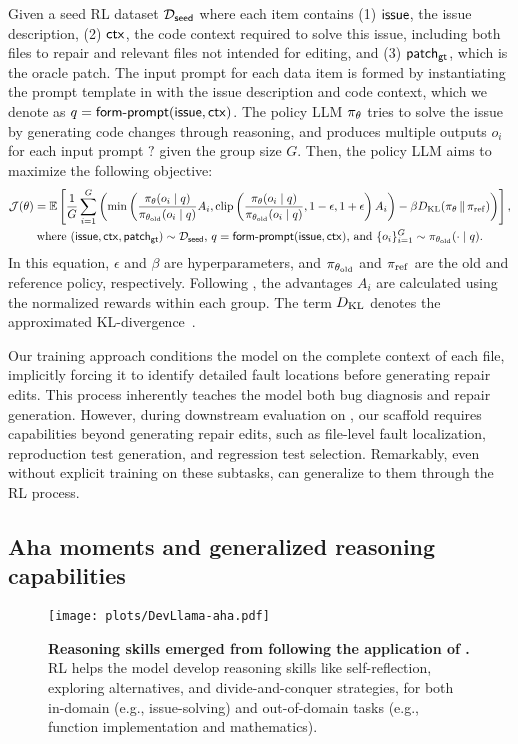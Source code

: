{Given a seed RL dataset $\mathcal D_\mathsf{seed}{}$ where each item contains
(1) $\mathsf{issue}{}$, the issue description,
(2) $\mathsf{ctx}$, the code context required to solve this issue, including both files to repair and relevant files not intended for editing,
and (3) $\mathsf{patch_{gt}}{}$, which is the oracle patch.
The input prompt for each data item is formed by instantiating the prompt template in  with the issue description and code context, which we denote as $q = \mathsf{form\mbox{-}prompt}(\mathsf{issue}, \mathsf{ctx})$.
The policy LLM $\mathit{\pi_{\theta}}$ tries to solve the issue by generating code changes through reasoning, and produces multiple outputs $o_i$ for each input prompt $\question$ given the group size $G$.
Then, the policy LLM aims to maximize the following \grpo objective:
\begin{equation}
\label{eq:grpo}
\begin{gathered}
\mathcal J(\theta) =
    {\mathbb E}\left[
         \frac1G\sum_{i=1}^G\left(
             \min\left(\frac {\mathit{\pi_{\theta}}(o_i \mid q)} {\mathit{\pi_{\theta_{\mathrm{old}}}}(o_i \mid q)} A_i, \mathrm{clip}\left(\frac {\mathit{\pi_{\theta}}(o_i \mid q)} {\mathit{\pi_{\theta_{\mathrm{old}}}}(o_i \mid q)}, 1-\epsilon, 1 + \epsilon\right)A_i\right)
             - \beta D_{\mathrm{KL}}(\mathit{\pi_{\theta}}\,\|\,\mathit{\pi_{\mathrm{ref}}})
         \right)
    \right],\\
    \text{where }(\mathsf{issue}, \mathsf{ctx}, \mathsf{patch_{gt}})\sim\mathcal D_\mathsf{seed}\text{, }
    q = \mathsf{form\mbox{-}prompt}(\mathsf{issue}, \mathsf{ctx})
    \text{, and }\{o_i\}_{i=1}^G \sim \mathit{\pi_{\theta_{\mathrm{old}}}}(\cdot \mid q).
\end{gathered}
\end{equation}
In this equation, $\epsilon$ and $\beta$ are hyperparameters, and $\mathit{\pi_{\theta_{\mathrm{old}}}}$ and $\mathit{\pi_{\mathrm{ref}}}$ are the old and reference policy, respectively.
Following \grpo, the advantages $A_i$ are calculated using the normalized rewards within each group. The term $D_{\mathrm{KL}}$ denotes the approximated KL-divergence~\cite{klapprox}.
}

Our training approach conditions the model on the complete context of each file, implicitly forcing it to identify detailed fault locations before generating repair edits. This process inherently teaches the model both bug diagnosis and repair generation.
However, during downstream evaluation on \swebench, our \ouragentless scaffold requires capabilities beyond generating repair edits, such as file-level fault localization, reproduction test generation, and regression test selection.
Remarkably, even without explicit training on these subtasks, \ours can generalize to them through the RL process.

\subsection{Aha moments and generalized reasoning capabilities}
\begin{figure}[htbp]
\centering
\texttt{[image: plots/DevLlama-aha.pdf]}
\caption{\textbf{Reasoning skills emerged from \ours[70] following the application of \tech{}.}
RL helps the model develop reasoning skills like self-reflection, exploring alternatives, and divide-and-conquer strategies, for both in-domain (e.g., issue-solving) and out-of-domain tasks (e.g., function implementation and mathematics).
}
\label{fig:case}
\end{figure}

